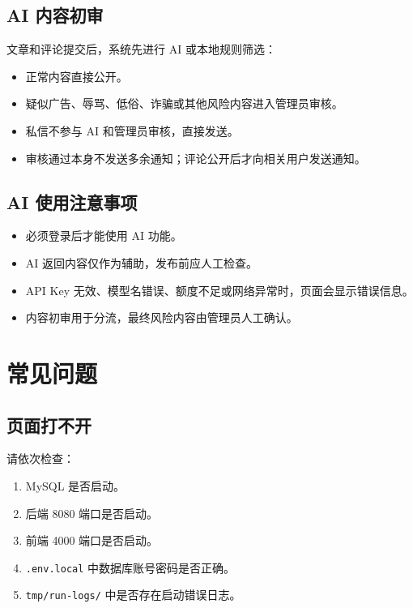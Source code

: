 \documentclass[UTF8,a4paper,12pt]{ctexart}
\newcommand{\code}[1]{\texttt{#1}}
\begin{document}
\subsection{AI 内容初审}

文章和评论提交后，系统先进行 AI 或本地规则筛选：

\begin{itemize}
  \item 正常内容直接公开。
  \item 疑似广告、辱骂、低俗、诈骗或其他风险内容进入管理员审核。
  \item 私信不参与 AI 和管理员审核，直接发送。
  \item 审核通过本身不发送多余通知；评论公开后才向相关用户发送通知。
\end{itemize}

\subsection{AI 使用注意事项}

\begin{itemize}
  \item 必须登录后才能使用 AI 功能。
  \item AI 返回内容仅作为辅助，发布前应人工检查。
  \item API Key 无效、模型名错误、额度不足或网络异常时，页面会显示错误信息。
  \item 内容初审用于分流，最终风险内容由管理员人工确认。
\end{itemize}

\section{常见问题}

\subsection{页面打不开}

请依次检查：

\begin{enumerate}
  \item MySQL 是否启动。
  \item 后端 8080 端口是否启动。
  \item 前端 4000 端口是否启动。
  \item \code{.env.local} 中数据库账号密码是否正确。
  \item \code{tmp/run-logs/} 中是否存在启动错误日志。
\end{enumerate}
\end{document}
